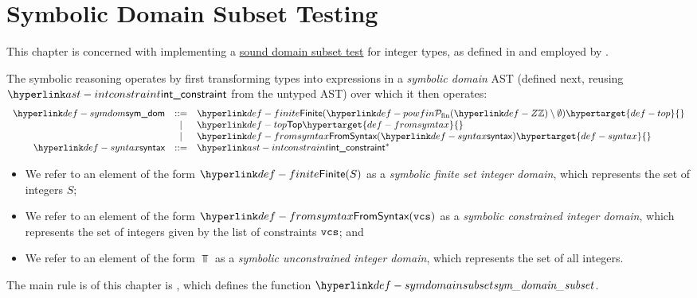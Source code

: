 \chapter{Symbolic Domain Subset Testing\label{chap:SymbolicDomainSubsetTesting}}
This chapter is concerned with implementing a \hyperlink{def-sounddomainsubsettest}{sound domain subset test}
for integer types, as defined in  and employed by
.

\hypertarget{def-symbolicdomain}{}
The symbolic reasoning operates by first transforming types into expressions in a \emph{symbolic domain} AST
(defined next, reusing $\intconstraint$ from the untyped AST) over which it then operates:
\hypertarget{def-symdom}{}
\hypertarget{def-finite}{}
\[
  \begin{array}{rcl}
    \symdom &::=& \Finite(\powfin{\Z} \setminus \emptyset) \hypertarget{def-top}{}\\
            &|  & \Top                      \hypertarget{def-fromsymtax}{}\\
            &|  & \FromSyntax(\syntax)      \hypertarget{def-syntax}{}\\
    \syntax &::=& \intconstraint^*
  \end{array}
\]

\begin{itemize}
  \item We refer to an element of the form $\Finite(S)$ as a \emph{symbolic finite set integer domain},
        which represents the set of integers $S$;
  \item We refer to an element of the form $\FromSyntax(\vcs)$ as a \emph{symbolic constrained integer domain},
        which represents the set of integers given by the list of constraints $\texttt{vcs}$; and
  \item We refer to an element of the form $\Top$ as a \emph{symbolic unconstrained integer domain},
        which represents the set of all integers.
\end{itemize}

The main rule is of this chapter is , which defines the function
$\symdomainsubset$.

